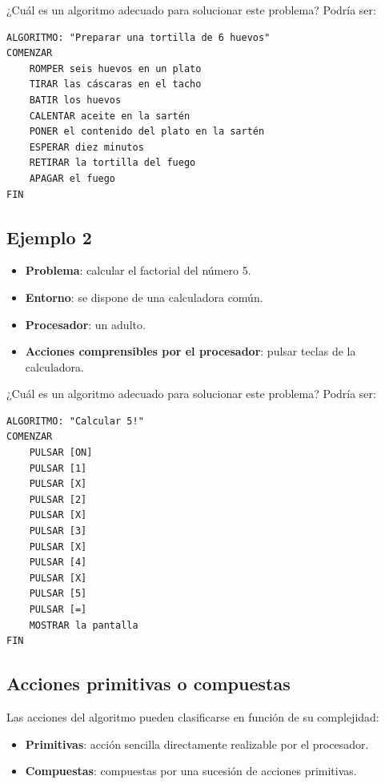 \documentclass[]{book}
\providecommand{\tightlist}{%
  \setlength{\itemsep}{0pt}\setlength{\parskip}{0pt}}
\begin{document}
¿Cuál es un algoritmo adecuado para solucionar este problema? Podría
ser:

\begin{verbatim}
ALGORITMO: "Preparar una tortilla de 6 huevos"
COMENZAR
    ROMPER seis huevos en un plato
    TIRAR las cáscaras en el tacho
    BATIR los huevos
    CALENTAR aceite en la sartén
    PONER el contenido del plato en la sartén
    ESPERAR diez minutos
    RETIRAR la tortilla del fuego
    APAGAR el fuego
FIN
\end{verbatim}

\subsection{Ejemplo 2}\label{ejemplo-2}

\begin{itemize}
\tightlist
\item
  \textbf{Problema}: calcular el factorial del número 5.
\item
  \textbf{Entorno}: se dispone de una calculadora común.
\item
  \textbf{Procesador}: un adulto.
\item
  \textbf{Acciones comprensibles por el procesador}: pulsar teclas de la
  calculadora.
\end{itemize}

¿Cuál es un algoritmo adecuado para solucionar este problema? Podría
ser:

\begin{verbatim}
ALGORITMO: "Calcular 5!"
COMENZAR
    PULSAR [ON]
    PULSAR [1]
    PULSAR [X]
    PULSAR [2]
    PULSAR [X]
    PULSAR [3]
    PULSAR [X]
    PULSAR [4]
    PULSAR [X]
    PULSAR [5]
    PULSAR [=]
    MOSTRAR la pantalla
FIN
\end{verbatim}

\subsection{Acciones primitivas o
compuestas}\label{acciones-primitivas-o-compuestas}

Las acciones del algoritmo pueden clasificarse en función de su
complejidad:

\begin{itemize}
\tightlist
\item
  \textbf{Primitivas}: acción sencilla directamente realizable por el
  procesador.
\item
  \textbf{Compuestas}: compuestas por una sucesión de acciones
  primitivas.
\end{itemize}
\end{document}
